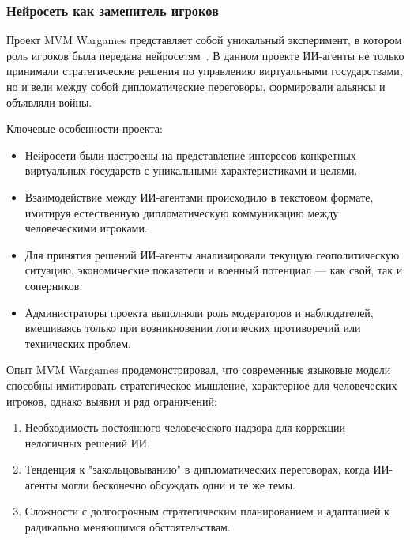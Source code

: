 \subsubsection{Нейросеть как заменитель игроков}

Проект MVM Wargames представляет собой уникальный эксперимент, в котором роль игроков была передана нейросетям~\cite{mvmwargames}. В данном проекте ИИ-агенты не только принимали стратегические решения по управлению виртуальными государствами, но и вели между собой дипломатические переговоры, формировали альянсы и объявляли войны.

Ключевые особенности проекта:

\begin{itemize}
    \item Нейросети были настроены на представление интересов конкретных виртуальных государств с уникальными характеристиками и целями.

    \item Взаимодействие между ИИ-агентами происходило в текстовом формате, имитируя естественную дипломатическую коммуникацию между человеческими игроками.

    \item Для принятия решений ИИ-агенты анализировали текущую геополитическую ситуацию, экономические показатели и военный потенциал — как свой, так и соперников.

    \item Администраторы проекта выполняли роль модераторов и наблюдателей, вмешиваясь только при возникновении логических противоречий или технических проблем.
\end{itemize}

Опыт MVM Wargames продемонстрировал, что современные языковые модели способны имитировать стратегическое мышление, характерное для человеческих игроков, однако выявил и ряд ограничений:

\begin{enumerate}
    \item Необходимость постоянного человеческого надзора для коррекции нелогичных решений ИИ.

    \item Тенденция к "{}закольцовыванию"{} в дипломатических переговорах, когда ИИ-агенты могли бесконечно обсуждать одни и те же темы.

    \item Сложности с долгосрочным стратегическим планированием и адаптацией к радикально меняющимся обстоятельствам.
\end{enumerate}

